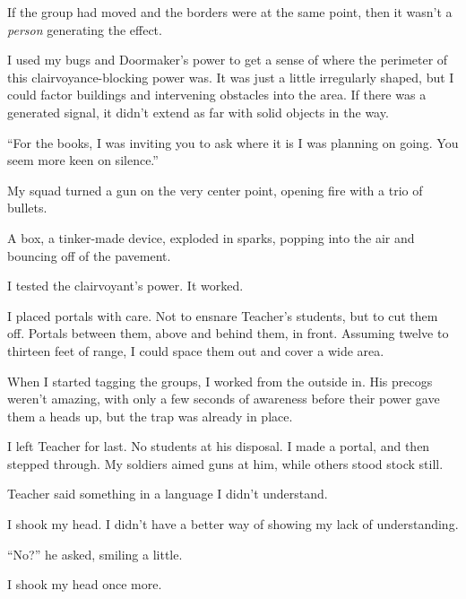 If the group had moved and the borders were at the same point, then it wasn't a \emph{person }generating the effect.



I used my bugs and Doormaker's power to get a sense of where the perimeter of this clairvoyance-blocking power was.  It was just a little irregularly shaped, but I could factor buildings and intervening obstacles into the area.  If there was a generated signal, it didn't extend as far with solid objects in the way.



``For the books, I was inviting you to ask where it is I was planning on going.  You seem more keen on silence.''



My squad turned a gun on the very center point, opening fire with a trio of bullets.



A box, a tinker-made device, exploded in sparks, popping into the air and bouncing off of the pavement.



I tested the clairvoyant's power.  It worked.



I placed portals with care.  Not to ensnare Teacher's students, but to cut them off.  Portals between them, above and behind them, in front.  Assuming twelve to thirteen feet of range, I could space them out and cover a wide area.



When I started tagging the groups, I worked from the outside in.  His precogs weren't amazing, with only a few seconds of awareness before their power gave them a heads up, but the trap was already in place.



I left Teacher for last.  No students at his disposal.  I made a portal, and then stepped through.  My soldiers aimed guns at him, while others stood stock still.



Teacher said something in a language I didn't understand.



I shook my head.  I didn't have a better way of showing my lack of understanding.



``No?'' he asked, smiling a little.



I shook my head once more.



